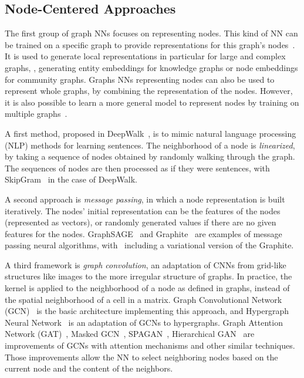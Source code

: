 \subsection{Node-Centered Approaches\label{sec:soa-node}}
The first group of graph NNs focuses on representing nodes.%
This kind of NN can be trained on a specific graph to provide representations for this graph's nodes~\cite{word2vec:2013:mikolov,deepwalk:2014:perozzi}.
It is used to generate local representations in particular for large and complex graphs, \eg{}, generating entity embeddings for knowledge graphs or node embeddings for community graphs.
Graphs NNs representing nodes can also be used to represent whole graphs, by combining the representation of the nodes.
However, it is also possible to learn a more general model to represent nodes by training on multiple graphs~\cite{gcn:2016:kipf}.

A first method, proposed in DeepWalk~\cite{deepwalk:2014:perozzi}, is to mimic natural language processing (NLP) methods for learning sentences.
The neighborhood of a node is \textit{linearized}, by taking a sequence of nodes obtained by randomly walking through the graph.
The sequences of nodes are then processed as if they were sentences, with SkipGram~\cite{word2vec:2013:mikolov} in the case of DeepWalk.

A second approach is \textit{message passing}, in which a node representation is built iteratively.
The nodes' initial representation can be the features of the nodes (represented as vectors), or randomly generated values if there are no given features for the nodes.
GraphSAGE~\cite{graph-sage:2017:hamilton} and Graphite~\cite{graphite:2018:grover} are examples of message passing neural algorithms, with~\cite{graphite:2018:grover} including a variational version of the Graphite.

A third framework is \textit{graph convolution}, an adaptation of CNNs from grid-like structures like images to the more irregular structure of graphs.
In practice, the kernel is applied to the neighborhood of a node as defined in graphs, instead of the spatial neighborhood of a cell in a matrix.
Graph Convolutional Network (GCN)~\cite{gcn:2016:kipf} is the basic architecture implementing this approach, and Hypergraph Neural Network~\cite{hypergraph-nn:2018:feng} is an adaptation of GCNs to hypergraphs.
Graph Attention Network (GAT)~\cite{gat:2017:velickovic}, Masked GCN~\cite{masked-gcn:2019:yang}, SPAGAN~\cite{spagan:2019:yang}, Hierarchical GAN~\cite{hierarchical-gan:2019:kim} are improvements of GCNs with attention mechanisms and other similar techniques. Those improvements allow the NN to select neighboring nodes based on the current node and the content of the neighbors.

